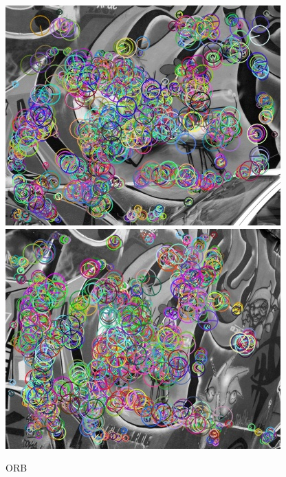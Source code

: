 		\begin{figure}[!htb]
				\includegraphics[width=\linewidth]{images/experiments/KP_ORB_0}
				\label{fig:awesome_image1}
			\endminipage\hfill
				\includegraphics[width=\linewidth]{images/experiments/KP_ORB_1}
				\label{fig:awesome_image2}
			\endminipage
			\caption{ORB}
		\end{figure}

\newpage

